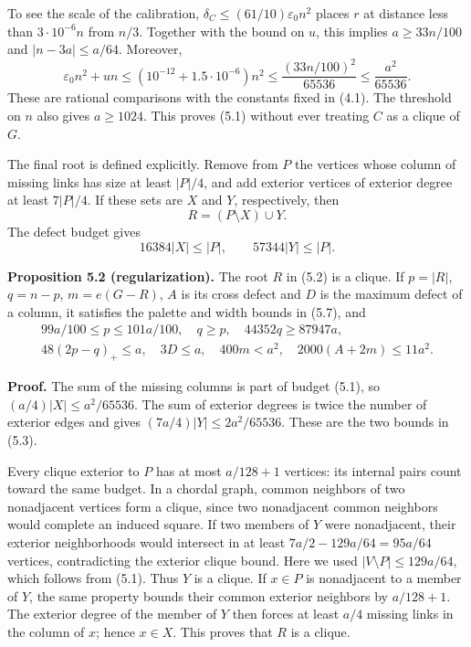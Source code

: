 \documentclass[english,11pt,a4paper]{article}
\begin{document}
To see the scale of the calibration, \(\delta_C\le(61/10)\varepsilon_0n^2\) places \(r\) at distance less than \(3\cdot10^{-6}n\) from \(n/3\). Together with the bound on \(u\), this implies \(a\ge33n/100\) and \(|n-3a|\le a/64\). Moreover, \[
\varepsilon_0n^2+un\le(10^{-12}+1.5\cdot10^{-6})n^2
\le\frac{(33n/100)^2}{65536}\le\frac{a^2}{65536}.
\] These are rational comparisons with the constants fixed in (4.1). The threshold on \(n\) also gives \(a\ge1024\). This proves (5.1) without ever treating \(C\) as a clique of \(G\).

The final root is defined explicitly. Remove from \(P\) the vertices whose column of missing links has size at least \(|P|/4\), and add exterior vertices of exterior degree at least \(7|P|/4\). If these sets are \(X\) and \(Y\), respectively, then \[
R=(P\setminus X)\cup Y.
\tag{5.2}
\] The defect budget gives \[
16384|X|\le |P|,\qquad 57344|Y|\le |P|.
\tag{5.3}
\] 

\textbf{Proposition 5.2 (regularization).} The root \(R\) in (5.2) is a clique. If \(p=|R|\), \(q=n-p\), \(m=e(G-R)\), \(A\) is its cross defect and \(D\) is the maximum defect of a column, it satisfies the palette and width bounds in (5.7), and \[
\begin{gathered}
99a/100\le p\le101a/100,\quad q\ge p,\quad
44352q\ge87947a,\\
48(2p-q)_+\le a,\quad 3D\le a,\quad
400m<a^2,\quad2000(A+2m)\le11a^2.
\end{gathered}
\tag{5.4}
\]

\textbf{Proof.} The sum of the missing columns is part of budget (5.1), so \((a/4)|X|\le a^2/65536\). The sum of exterior degrees is twice the number of exterior edges and gives \((7a/4)|Y|\le2a^2/65536\). These are the two bounds in (5.3).

Every clique exterior to \(P\) has at most \(a/128+1\) vertices: its internal pairs count toward the same budget. In a chordal graph, common neighbors of two nonadjacent vertices form a clique, since two nonadjacent common neighbors would complete an induced square. If two members of \(Y\) were nonadjacent, their exterior neighborhoods would intersect in at least \(7a/2-129a/64=95a/64\) vertices, contradicting the exterior clique bound. Here we used \(|V\setminus P|\le129a/64\), which follows from (5.1). Thus \(Y\) is a clique. If \(x\in P\) is nonadjacent to a member of \(Y\), the same property bounds their common exterior neighbors by \(a/128+1\). The exterior degree of the member of \(Y\) then forces at least \(a/4\) missing links in the column of \(x\); hence \(x\in X\). This proves that \(R\) is a clique.
\end{document}
